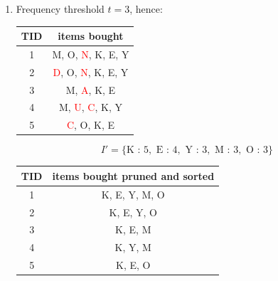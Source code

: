 \documentclass{article}
\begin{document}
  \begin{enumerate}[label=(\roman*)]
  \item Frequency threshold $t = 3$, hence:
    \begin{center}
      \begin{tabular}{|c|c|}
        \hline
        TID & items bought \\ \hline
        1 & M, O, \textcolor{red}{N}, K, E, Y \\ \hline
        2 & \textcolor{red}{D}, O, \textcolor{red}{N}, K, E, Y \\ \hline
        3 & M, \textcolor{red}{A}, K, E \\ \hline
        4 & M, \textcolor{red}{U}, \textcolor{red}{C}, K, Y \\ \hline
        5 & \textcolor{red}{C}, O, K, E \\ \hline
      \end{tabular}
    \end{center}
    $$I' = \{ \text{K : } 5, \text{ E : } 4,\text{ Y : } 3,\text{ M : } 3,\text{ O : } 3 \}$$
    \begin{center}
      \begin{tabular}{|c|c|}
        \hline
        TID & items bought pruned and sorted \\ \hline
        1 & K, E, Y, M, O \\ \hline
        2 & K, E, Y, O \\ \hline
        3 & K, E, M \\ \hline
        4 & K, Y, M \\ \hline
        5 & K, E, O \\ \hline
      \end{tabular}
    \end{center}


\end{enumerate}
\end{document}
